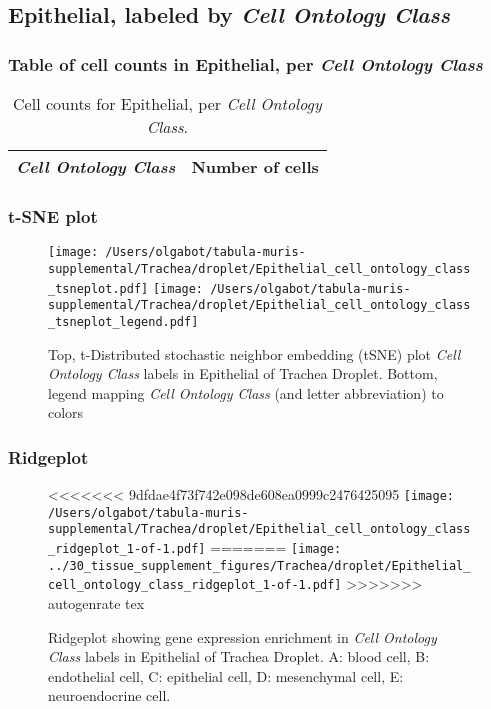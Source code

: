\clearpage

\subsection{Epithelial, labeled by \emph{Cell Ontology Class}}
\subsubsection{Table of cell counts in Epithelial, per \emph{Cell Ontology Class}}\begin{table}[h]
\centering
\label{my-label}
\begin{tabular}{@{}ll@{}}
\toprule

\emph{Cell Ontology Class}& Number of cells \\ \midrule\bottomrule
\end{tabular}
\caption{Cell counts for Epithelial, per \emph{Cell Ontology Class}.}
\end{table}

\clearpage
\subsubsection{t-SNE plot}
\begin{figure}[h]
\centering
\texttt{[image: /Users/olgabot/tabula-muris-supplemental/Trachea/droplet/Epithelial\_cell\_ontology\_class\_tsneplot.pdf]}
\texttt{[image: /Users/olgabot/tabula-muris-supplemental/Trachea/droplet/Epithelial\_cell\_ontology\_class\_tsneplot\_legend.pdf]}
\caption{Top, t-Distributed stochastic neighbor embedding (tSNE) plot  \emph{Cell Ontology Class} labels in Epithelial of Trachea Droplet. Bottom, legend mapping \emph{Cell Ontology Class} (and letter abbreviation) to colors}
\end{figure}


\clearpage

\subsubsection{Ridgeplot}
\begin{figure}[h]
\centering
<<<<<<< 9dfdae4f73f742e098de608ea0999c2476425095
\texttt{[image: /Users/olgabot/tabula-muris-supplemental/Trachea/droplet/Epithelial\_cell\_ontology\_class\_ridgeplot\_1-of-1.pdf]}
=======
\texttt{[image: ../30\_tissue\_supplement\_figures/Trachea/droplet/Epithelial\_cell\_ontology\_class\_ridgeplot\_1-of-1.pdf]}
>>>>>>> autogenrate tex

\caption{ Ridgeplot  showing gene expression enrichment in \emph{Cell Ontology Class} labels in Epithelial of Trachea Droplet. A: blood cell, B: endothelial cell, C: epithelial cell, D: mesenchymal cell, E: neuroendocrine cell.}
\end{figure}


